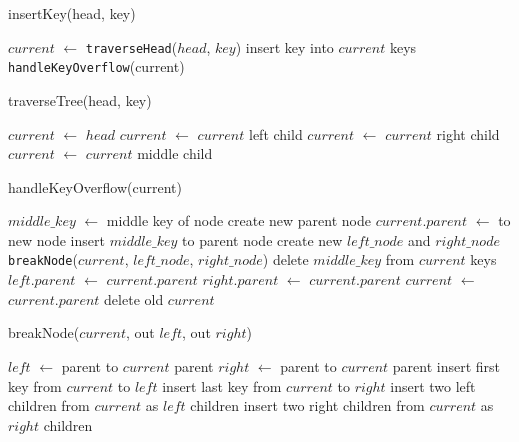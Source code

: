 \documentclass{article}
\begin{document}
\begin{function}
	\caption{insertKey(head, key)}
	\DontPrintSemicolon
	$current$ $\gets$ \texttt{traverseHead}($head$, $key$)\;
	insert key into $current$ keys\;
	\texttt{handleKeyOverflow}(current)\;
\end{function}

\begin{function}
	\caption{traverseTree(head, key)}
	\DontPrintSemicolon
	$current$ $\gets$ $head$\;
	{
		{
			$current$ $\gets$ $current$ left child\;
		}
		{
			$current$ $\gets$ $current$ right child\;
		}
		\Else
		{
			$current$ $\gets$ $current$ middle child\;
		}
	}
\end{function}

\begin{function}
	\caption{handleKeyOverflow(current)}
	\DontPrintSemicolon
	{
		$middle\_key$ $\gets$ middle key of node\;
		{
			create new parent node\;
			$current.parent$ $\gets$ to new node\;
		}
		insert $middle\_key$ to parent node\;
		create new $left\_node$ and $right\_node$\;
		\texttt{breakNode}($current$, $left\_node$, $right\_node$)\;
		delete $middle\_key$ from $current$ keys\;
		$left.parent$ $\gets$ $current.parent$\;
		$right.parent$ $\gets$ $current.parent$\;
		$current$ $\gets$ $current.parent$\;
		delete old $current$\;
	}
\end{function}

\begin{function}
	\caption{breakNode($current$, out $left$, out $right$)}
	\DontPrintSemicolon
	$left$ $\gets$ parent to $current$ parent\;
	$right$ $\gets$ parent to $current$ parent\;
	insert first key from $current$ to $left$\;
	insert last key from $current$ to $right$\;
	{
		insert two left children from $current$ as $left$ children\;
		insert two right children from $current$ as $right$ children\;
	}
\end{function}
\end{document}
